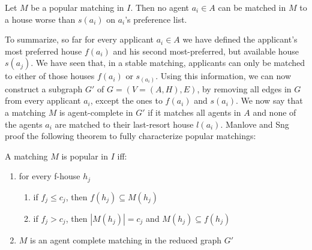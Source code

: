 \newtheorem{lemma-popular-3}[theorem]{Lemma}
\begin{lemma}\label{lemma-popular3}
    Let $M$ be a popular matching in $I$. Then no agent $a_i \in A$ can be matched in $M$ to a house worse than $s(a_i)$ on $a_i$'s preference list.
\end{lemma} 

To summarize, so far for every applicant $a_i \in A$ we have defined the applicant's most preferred house $f(a_i)$ and his second most-preferred, but available house $s(a_j)$. We have seen that, in a stable matching, applicants can only be matched to either of those houses $f(a_i)$ or $s_(a_i)$. Using this information, we can now construct a subgraph $G'$ of $G = (V=(A, H), E)$, by removing all edges in $G$ from every applicant $a_i$, except the ones to $f(a_i)$ and $s(a_i)$. We now say that a matching $M$ is agent-complete in $G'$ if it matches all agents in $A$ and none of the agents $a_i$ are matched to their last-resort house $l(a_i)$.\cite{ManlovePopularMatchings} Manlove and Sng proof the following theorem to fully characterize popular matchings\cite{ManlovePopularMatchings}:
\newtheorem{theorem-popular-4}[theorem]{Theorem}
\begin{theorem}\label{theorem-popular-4}
    A matching $M$ is popular in $I$ iff:
    \begin{enumerate}
        \item for every f-house $h_j$
        \begin{enumerate}
            \item\label{condition1a} if $f_j \leq c_j$, then $f(h_j) \subseteq M(h_j)$
            \item\label{condition1b} if $f_j > c_j$, then $|M(h_j)| = c_j$ and $M(h_j) \subseteq f(h_j)$
        \end{enumerate}
        \item $M$ is an agent complete matching in the reduced graph $G'$
    \end{enumerate}
\end{theorem} 

